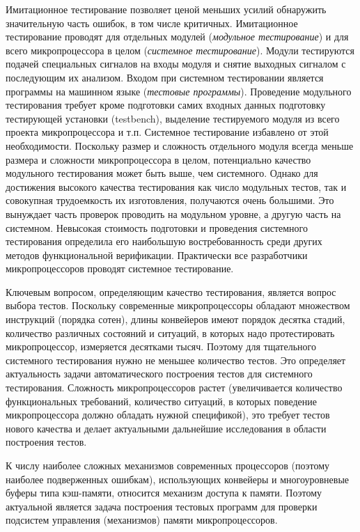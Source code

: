 {Имитационное тестирование позволяет ценой меньших усилий обнаружить значительную часть ошибок, в том числе критичных. Имитационное тестирование проводят для отдельных модулей (\emph{модульное тестирование}) и для всего микропроцессора в целом (\emph{системное тестирование}). Модули тестируются подачей специальных сигналов на входы модуля и снятие выходных сигналом с последующим их анализом. Входом при системном тестировании является программы на машинном языке (\emph{тестовые программы}). Проведение модульного тестирования требует кроме подготовки самих входных данных подготовку тестирующей установки (testbench), выделение тестируемого модуля из всего проекта микропроцессора и т.п. Системное тестирование избавлено от этой необходимости. Поскольку размер и сложность отдельного модуля всегда меньше размера и сложности микропроцессора в целом, потенциально качество модульного тестирования может быть выше, чем системного. Однако для достижения высокого качества тестирования как число модульных тестов, так и совокупная трудоемкость их изготовления, получаются очень большими. Это вынуждает часть проверок проводить на модульном уровне, а другую часть на системном. Невысокая стоимость подготовки и проведения системного тестирования определила его наибольшую востребованность среди других методов функциональной верификации. Практически все разработчики микропроцессоров проводят системное тестирование.

Ключевым вопросом, определяющим качество тестирования, является вопрос выбора тестов. Поскольку современные микропроцессоры обладают множеством инструкций (порядка сотен), длины конвейеров имеют порядок десятка стадий, количество различных состояний и ситуаций, в которых надо протестировать микропроцессор, измеряется десятками тысяч. Поэтому для тщательного системного тестирования нужно не меньшее количество тестов. Это определяет актуальность задачи автоматического построения тестов для системного тестирования. Сложность микропроцессоров растет (увеличивается количество функциональных требований, количество ситуаций, в которых поведение микропроцессора должно обладать нужной спецификой), это требует тестов нового качества и делает актуальными дальнейшие исследования в области построения тестов.


К числу наиболее сложных механизмов современных процессоров (поэтому наиболее подверженных ошибкам), использующих конвейеры и многоуровневые буферы типа кэш-памяти, относится механизм доступа к памяти. Поэтому актуальной является задача построения тестовых программ для проверки подсистем управления (механизмов) памяти микропроцессоров.

}
